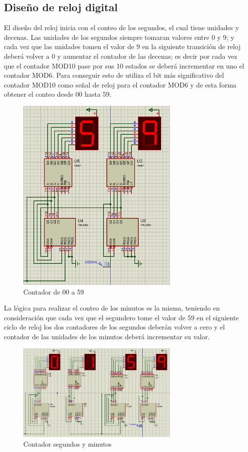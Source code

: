 \subsection{Diseño de reloj digital}
El diseño del reloj inicia con el conteo de los segundos, el cual tiene unidades y decenas. Las unidades de los segundos siempre tomaran valores entre 0 y 9; y cada vez que las unidades  tomen  el  valor  de  9  en  la  siguiente  transición  de  reloj  deberá  volver  a  0  y aumentar el contador de las decenas; es decir por cada vez que el contador MOD10 pase por sus 10 estados se deberá incrementar en uno el contador MOD6.  
\newline
Para conseguir esto de utiliza el bit más significativo del contador MOD10 como señal de reloj para el contador MOD6 y de esta forma obtener el conteo desde 00 hasta 59. 
\begin{figure}[h]
    \begin{center}
    \includegraphics[width=8cm]{images/image6.png}
    \newline
    \caption{Contador de 00 a 59}\label{cont_59}
    \end{center}
\end{figure}
La lógica para realizar el conteo de los minutos es la misma, teniendo en consideración que cada vez que el segundero tome el valor de 59 en el siguiente ciclo de reloj los dos contadores de  los  segundos  deberán  volver  a  cero  y  el  contador  de  las  unidades de  los minutos deberá incrementar su valor.
\begin{figure}[h]
    \begin{center}
    \includegraphics[width=8cm]{images/image7.png}
    \newline
    \caption{Contador segundos y minutos}\label{cont_hs}
    \end{center}
\end{figure}
